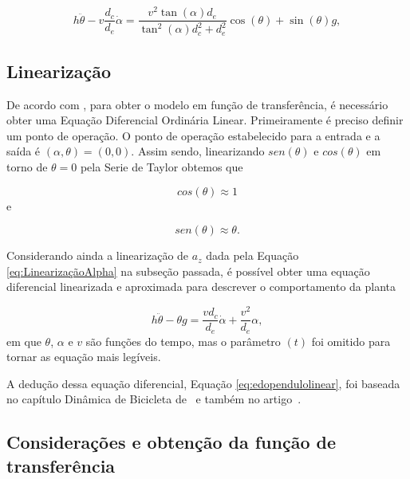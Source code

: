         \begin{equation}
            h \ddot \theta - v\frac{d_c}{d_e}\dot \alpha = \frac{v^2\tan(\alpha)d_e}{\tan^2(\alpha)d_c^2+d_e^2} \cos(\theta) + \sin(\theta)g,
        \end{equation}
        
        \subsection{Linearização}
        
            De acordo com \cite{book:dorf}, para obter o modelo em função de transferência, é necessário obter uma Equação Diferencial Ordinária Linear. Primeiramente é preciso definir um ponto de operação. O ponto de operação estabelecido para a entrada e a saída é $(\alpha,\theta)=(0,0)$. Assim sendo, linearizando $sen(\theta)$ e $cos(\theta)$ em torno de $\theta=0$ pela Serie de Taylor obtemos que
            
            \begin{equation}
                cos(\theta) \approx 1
            \end{equation}
            e
            
            \begin{equation}
                sen(\theta) \approx \theta. 
            \end{equation}
            
            Considerando ainda a linearização de $a_z$ dada pela Equação \eqref{eq:LinearizaçãoAlpha} na subseção passada, é possível obter uma equação diferencial linearizada e aproximada para descrever o comportamento da planta
            
            \begin{equation}
                h \ddot \theta -\theta g = \frac{vd_c}{d_e}\dot \alpha +\frac{v^2}{d_e}\alpha,
                \label{eq:edopendulolinear}
            \end{equation}
            em que $\theta$, $\alpha$ e $v$ são funções do tempo, mas o parâmetro $(t)$ foi omitido para tornar as equação mais legíveis.
            
            A dedução dessa equação diferencial, Equação \ref{eq:edopendulolinear}, foi baseada no capítulo Dinâmica de Bicicleta de~\cite{book:astom} e também no artigo~\cite{article:astom}.
            
        \subsection{Considerações e obtenção da função de transferência}
        
